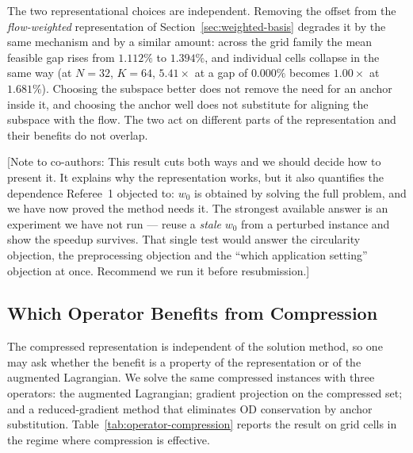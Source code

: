\documentclass[11pt]{article}
\newif\ifshownotes \shownotestrue
\newcommand{\conote}[1]{\ifshownotes{\color{red}\small\textsf{[Note to co-authors: #1]}}\fi}
\begin{document}
The two representational choices are independent. Removing the offset from the
\emph{flow-weighted} representation of Section~\ref{sec:weighted-basis} degrades it by the same
mechanism and by a similar amount: across the grid family the mean feasible gap rises from
$1.112\%$ to $1.394\%$, and individual cells collapse in the same way (at $N=32$, $K=64$,
$5.41\times$ at a gap of $0.000\%$ becomes $1.00\times$ at $1.681\%$). Choosing the subspace
better does not remove the need for an anchor inside it, and choosing the anchor well does not
substitute for aligning the subspace with the flow. The two act on different parts of the
representation and their benefits do not overlap.

\conote{This result cuts both ways and we should decide how to present it. It explains why the
representation works, but it also quantifies the dependence Referee~1 objected to: $w_0$ is
obtained by solving the full problem, and we have now proved the method needs it. The
strongest available answer is an experiment we have not run --- reuse a \emph{stale} $w_0$
from a perturbed instance and show the speedup survives. That single test would answer the
circularity objection, the preprocessing objection and the ``which application setting''
objection at once. Recommend we run it before resubmission.}


\subsection{Which Operator Benefits from Compression}
\label{sec:operator-study}


The compressed representation is independent of the solution method, so one may ask whether
the benefit is a property of the representation or of the augmented Lagrangian. We solve the
same compressed instances with three operators: the augmented Lagrangian; gradient projection
on the compressed set; and a reduced-gradient method that eliminates OD conservation by
anchor substitution. Table~\ref{tab:operator-compression} reports the result on grid cells in
the regime where compression is effective.
\end{document}
